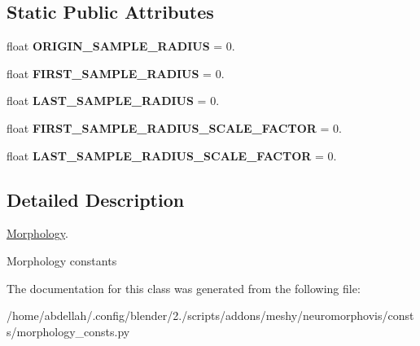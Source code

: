\subsection*{Static Public Attributes}
\begin{DoxyCompactItemize}
\item 
float {\bfseries O\+R\+I\+G\+I\+N\+\_\+\+S\+A\+M\+P\+L\+E\+\_\+\+R\+A\+D\+I\+US} = 0.\hypertarget{classmeshy_1_1neuromorphovis_1_1consts_1_1morphology__consts_1_1Morphology_a29c500e8acfa28452dbe0539ac265bb0}{}\label{classmeshy_1_1neuromorphovis_1_1consts_1_1morphology__consts_1_1Morphology_a29c500e8acfa28452dbe0539ac265bb0}

\item 
float {\bfseries F\+I\+R\+S\+T\+\_\+\+S\+A\+M\+P\+L\+E\+\_\+\+R\+A\+D\+I\+US} = 0.\hypertarget{classmeshy_1_1neuromorphovis_1_1consts_1_1morphology__consts_1_1Morphology_a0e7e59d25900bd52a1d4f4e64b80643d}{}\label{classmeshy_1_1neuromorphovis_1_1consts_1_1morphology__consts_1_1Morphology_a0e7e59d25900bd52a1d4f4e64b80643d}

\item 
float {\bfseries L\+A\+S\+T\+\_\+\+S\+A\+M\+P\+L\+E\+\_\+\+R\+A\+D\+I\+US} = 0.\hypertarget{classmeshy_1_1neuromorphovis_1_1consts_1_1morphology__consts_1_1Morphology_ade946fd82048c0910180e50de4d9263a}{}\label{classmeshy_1_1neuromorphovis_1_1consts_1_1morphology__consts_1_1Morphology_ade946fd82048c0910180e50de4d9263a}

\item 
float {\bfseries F\+I\+R\+S\+T\+\_\+\+S\+A\+M\+P\+L\+E\+\_\+\+R\+A\+D\+I\+U\+S\+\_\+\+S\+C\+A\+L\+E\+\_\+\+F\+A\+C\+T\+OR} = 0.\hypertarget{classmeshy_1_1neuromorphovis_1_1consts_1_1morphology__consts_1_1Morphology_a7cdec7f9ff295c5f3d10edc14a29b853}{}\label{classmeshy_1_1neuromorphovis_1_1consts_1_1morphology__consts_1_1Morphology_a7cdec7f9ff295c5f3d10edc14a29b853}

\item 
float {\bfseries L\+A\+S\+T\+\_\+\+S\+A\+M\+P\+L\+E\+\_\+\+R\+A\+D\+I\+U\+S\+\_\+\+S\+C\+A\+L\+E\+\_\+\+F\+A\+C\+T\+OR} = 0.\hypertarget{classmeshy_1_1neuromorphovis_1_1consts_1_1morphology__consts_1_1Morphology_ab9a8d8c389863956f8f0b9529fc15ce2}{}\label{classmeshy_1_1neuromorphovis_1_1consts_1_1morphology__consts_1_1Morphology_ab9a8d8c389863956f8f0b9529fc15ce2}

\end{DoxyCompactItemize}


\subsection{Detailed Description}
\hyperlink{classmeshy_1_1neuromorphovis_1_1consts_1_1morphology__consts_1_1Morphology}{Morphology}. 

\begin{DoxyVerb}Morphology constants
\end{DoxyVerb}
 

The documentation for this class was generated from the following file\+:\begin{DoxyCompactItemize}
\item 
/home/abdellah/.\+config/blender/2./scripts/addons/meshy/neuromorphovis/consts/morphology\+\_\+consts.\+py\end{DoxyCompactItemize}
